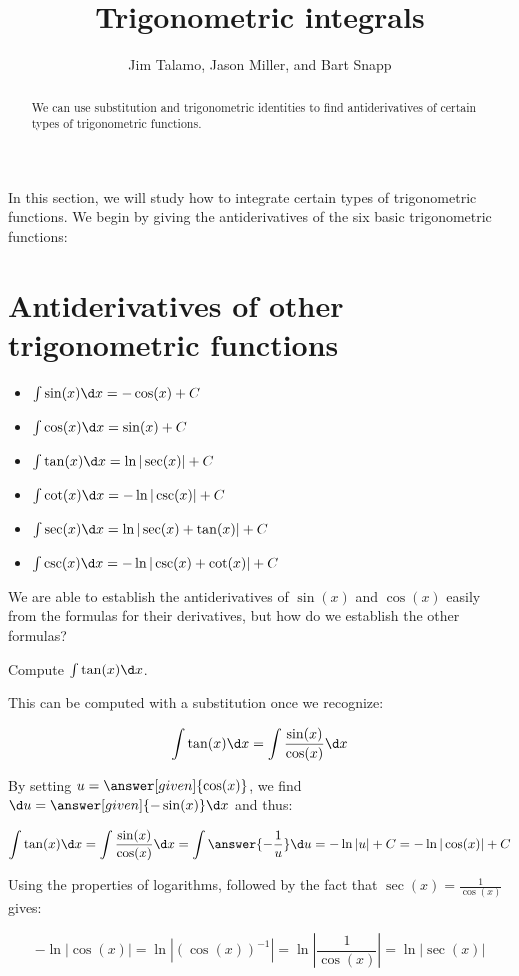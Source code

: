 \documentclass{ximera}
\author{Jim Talamo, Jason Miller, and Bart Snapp}
\title[Dig-In:]{Trigonometric integrals}
\begin{document}
\begin{abstract}
  We can use substitution and trigonometric identities to find antiderivatives of certain types of
  trigonometric functions.
\end{abstract}
\maketitle

In this section, we will study how to integrate certain types of trigonometric functions.  We begin by giving the antiderivatives of the six basic trigonometric functions:


\section{Antiderivatives of other trigonometric functions}

\begin{theorem}\hfil
  \begin{itemize}
  \item $\int \sin(x) \d x = - \cos(x)+C$
  \item $\int \cos(x) \d x = \sin(x)+C$
  \item $\int \tan(x) \d x = \ln|\sec(x)| + C$
  \item $\int \cot(x) \d x = -\ln|\csc(x)| + C$
  \item $\int \sec(x) \d x = \ln|\sec(x) + \tan(x)| + C$
  \item $\int \csc(x) \d x = -\ln|\csc(x) + \cot(x)| + C$
  \end{itemize}
\end{theorem}

We are able to establish the antiderivatives of $\sin(x)$ and $\cos(x)$ easily from the formulas for their derivatives, but how do we establish the other formulas?  

\begin{example}
Compute $\int \tan(x) \d x$.

\begin{explanation}
This can be computed with a substitution once we recognize:

\[
\int \tan(x) \d x = \int \frac{\sin(x)}{\cos(x)} \d x
\]

By setting $u = \answer[given]{\cos(x)}$, we find $\d u = \answer[given]{-\sin(x)} \d x$ and thus:

\[
\int \tan(x) \d x = \int \frac{\sin(x)}{\cos(x)} \d x =\int \answer{-  \frac{1}{u}} \d u =-\ln|u|+C = -\ln|\cos(x)|+C
\]

Using the properties of logarithms, followed by the fact that $\sec(x) = \frac{1}{\cos(x)}$ gives:

\[
-\ln|\cos(x)| = \ln \left| (\cos(x))^{-1} \right| = \ln \left| \frac{1}{\cos(x)} \right| = \ln|\sec(x)|
\]
\end{explanation}

\end{example}
 
\end{document}
